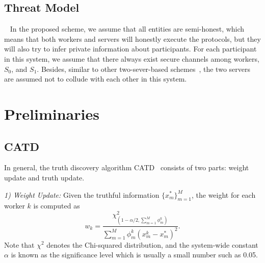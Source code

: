 \documentclass[conference]{IEEEtran}
\begin{document}
\subsection{Threat Model}~\label{sub:threat}
In the proposed scheme, we assume that all entities are semi-honest, which means that both workers and servers will honestly execute the protocols, but they will also try to infer private information about participants.
For each participant in this system, we assume that there always exist secure channels among workers, $S_0$, and $S_1$.
Besides, similar to other two-sever-based schemes~\cite{miao_lightweight_2017,zhang_reliable_2019}, the two servers are assumed not to collude with each other in this system.


\section{Preliminaries}\label{sec4}
\subsection{CATD}
In general, the truth discovery algorithm CATD~\cite{li_confidence-aware_2014} consists of two parts: weight update and truth update.

\textit{1) Weight Update:} Given the truthful information $\{x_m^*\}_{m=1}^M$, the weight for each worker $k$ is computed as
\begin{equation*}
w_k = \frac{\chi^2_{(1-\alpha/2,\sum_{m=1}^M \phi_m^k)}}{\sum_{m=1}^M \phi_m^k(x_m^k - x_m^*)^2}.
\end{equation*}
Note that $\chi^2$ denotes the Chi-squared distribution, and the system-wide constant $\alpha$ is known as the significance level which is usually a small number such as 0.05.
\end{document}
